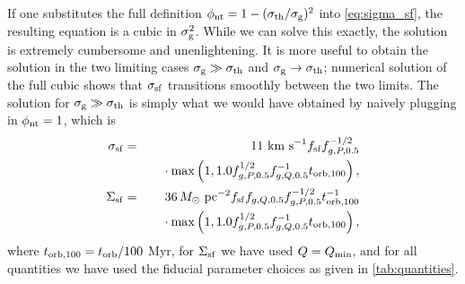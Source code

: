 \documentclass[useAMS,usenatbib]{mn2e}
\newcommand{\Qmin}{Q_{\rm min}}
\begin{document}
If one substitutes the full definition $\phi_{\rm nt} = 1 - (\sigma_{\rm th} / \sigma_{\rm g})^2$ into \autoref{eq:sigma_sf}, the resulting equation is a cubic in $\sigma_{\rm g}^2$. While we can solve this exactly, the solution is extremely cumbersome and unenlightening. It is more useful to obtain the solution in the two limiting cases $\sigma_{\rm g} \gg \sigma_{\rm th}$ and $\sigma_{\rm g} \rightarrow \sigma_{\rm th}$; numerical solution of the full cubic shows that $\sigma_{\rm sf}$ transitions smoothly between the two limits. The solution for $\sigma_{\rm g} \gg \sigma_{\rm th}$ is simply what we would have obtained by naively plugging in $\phi_{\rm nt} = 1$, which is
\begin{eqnarray}
\sigma_{\rm sf} & = & 11\mbox{ km s}^{-1} f_{\rm sf} f_{g,P,0.5}^{-1/2}
\nonumber \\
& &
\quad {} \cdot \max\left(1, 1.0 f_{g,P,0.5}^{1/2} f_{g,Q,0.5}^{-1} t_{\rm orb,100}\right),
\label{eq:sigma_sf_num1}
\\
\Sigma_{\rm sf} & = & 36 \, M_\odot\mbox{ pc}^{-2} f_{\rm sf} f_{g,Q,0.5} f_{g,P,0.5}^{-1/2} t_{\rm orb,100}^{-1} 
\nonumber \\
& &
\quad {} \cdot \max\left(1, 1.0 f_{g,P,0.5}^{1/2} f_{g,Q,0.5}^{-1} t_{\rm orb,100}\right),
\end{eqnarray}
where $t_{\rm orb,100} = t_{\rm orb}/100$ Myr, for $\Sigma_{\rm sf}$ we have used $Q=\Qmin$, and for all quantities we have used the fiducial parameter choices as given in \autoref{tab:quantities}.
\end{document}
